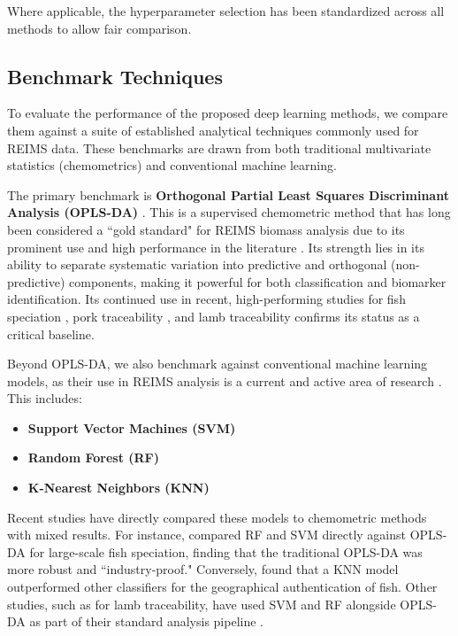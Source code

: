 Where applicable, the hyperparameter selection has been standardized across all methods to allow fair comparison. 

\subsection{Benchmark Techniques}

To evaluate the performance of the proposed deep learning methods, we compare them against a suite of established analytical techniques commonly used for REIMS data. These benchmarks are drawn from both traditional multivariate statistics (chemometrics) and conventional machine learning.

The primary benchmark is \textbf{Orthogonal Partial Least Squares Discriminant Analysis (OPLS-DA)} \citep{Bylesjoe2006}. This is a supervised chemometric method that has long been considered a ``gold standard" for REIMS biomass analysis due to its prominent use and high performance in the literature \citep{Balog2010,Jha2015,Black2017,Black2019}. Its strength lies in its ability to separate systematic variation into predictive and orthogonal (non-predictive) components, making it powerful for both classification and biomarker identification. Its continued use in recent, high-performing studies for fish speciation \citep{Shen2020, Shen2022}, pork traceability \citep{Gkarane2025}, and lamb traceability \citep{Gao2025} confirms its status as a critical baseline.

Beyond OPLS-DA, we also benchmark against conventional machine learning models, as their use in REIMS analysis is a current and active area of research \citep{Xue2025}. This includes:

\begin{itemize}
    \item \textbf{Support Vector Machines (SVM)}
    \item \textbf{Random Forest (RF)}
    \item \textbf{K-Nearest Neighbors (KNN)}
    \end{itemize}
    
Recent studies have directly compared these models to chemometric methods with mixed results. For instance, \citet{De2023} compared RF and SVM directly against OPLS-DA for large-scale fish speciation, finding that the traditional OPLS-DA was more robust and ``industry-proof." Conversely, \citet{Lu2024} found that a KNN model outperformed other classifiers for the geographical authentication of fish. Other studies, such as for lamb traceability, have used SVM and RF alongside OPLS-DA as part of their standard analysis pipeline \citep{Gao2025}.

